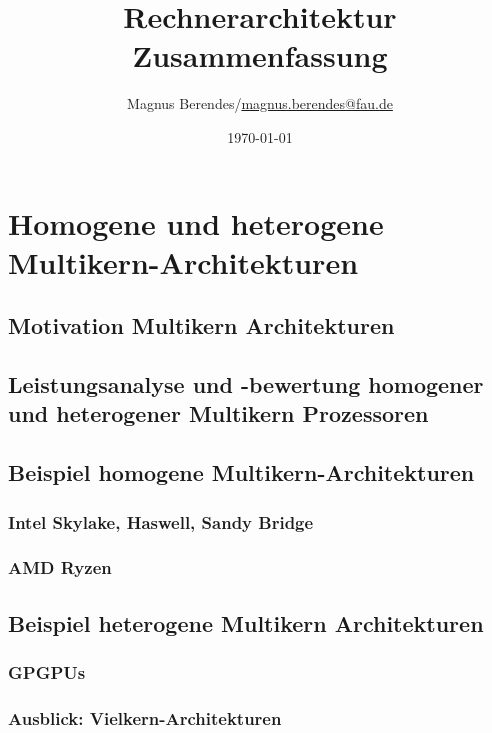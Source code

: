\documentclass[a4paper,12pt]{scrartcl}
\begin{document}
\title{Rechnerarchitektur Zusammenfassung}
\author{Magnus Berendes/\href{mailto:magnus.berendes@fau.de}{magnus.berendes@fau.de}}
\date{\today}
\maketitle

\newpage


\tableofcontents


\newpage
{}






\newpage
\section{Homogene und heterogene Multikern-Architekturen}
\subsection{Motivation Multikern Architekturen}
\subsection{Leistungsanalyse und -bewertung homogener und heterogener Multikern Prozessoren}
\subsection{Beispiel homogene Multikern-Architekturen}
\subsubsection{Intel Skylake, Haswell, Sandy Bridge}
\subsubsection{ AMD Ryzen}

\subsection{Beispiel heterogene Multikern Architekturen}
\subsubsection{GPGPUs}
\subsubsection{Ausblick: Vielkern-Architekturen}
\end{document}
